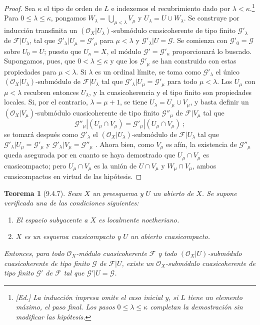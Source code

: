 \documentclass[oneside]{amsart}
\theoremstyle{ega-env-style}
\theoremstyle{ega-thm-env-style}
\newtheorem*{theorem}{Teorema}
\theoremstyle{ega-defn-env-style}
\def\leq{\leqslant}                 %
\let\EGAOriginalLabel\label
\renewcommand{\label}[1]{\phantomsection\EGAOriginalLabel{#1}}
\begin{document}
\begin{proof}
Sea $\kappa$ el tipo de orden de $L$ e indexemos el recubrimiento dado por $\lambda<\kappa$.\footnote{\emph{[Ed.] La inducción impresa omite el caso inicial y, si $L$ tiene un elemento máximo, el paso final. Los pasos $0\leq\lambda\leq\kappa$ completan la demostración sin modificar las hipótesis.}}
Para $0\leq\lambda\leq\kappa$, pongamos $W_\lambda=\bigcup_{\mu<\lambda}V_\mu$ y $U_\lambda=U\cup W_\lambda$.
Se construye por inducción transfinita un $(\mathscr{O}_X|U_\lambda)$-submódulo cuasicoherente de tipo finito
$\mathscr{G}'_\lambda$ de $\mathscr{F}|U_\lambda$, tal que $\mathscr{G}'_\lambda|U_\mu=\mathscr{G}'_\mu$ para $\mu<\lambda$ y
$\mathscr{G}'_\lambda|U=\mathscr{G}$.
Se comienza con $\mathscr{G}'_0=\mathscr{G}$ sobre $U_0=U$; puesto que $U_\kappa=X$,
el módulo $\mathscr{G}'=\mathscr{G}'_\kappa$ proporcionará lo buscado.
Supongamos, pues, que $0<\lambda\leq\kappa$ y que los $\mathscr{G}'_\mu$ se han construido con estas propiedades
para $\mu<\lambda$.
Si $\lambda$ es un ordinal límite, se toma como $\mathscr{G}'_\lambda$ el único $(\mathscr{O}_X|U_\lambda)$-submódulo de
$\mathscr{F}|U_\lambda$ tal que $\mathscr{G}'_\lambda|U_\mu=\mathscr{G}'_\mu$ para todo $\mu<\lambda$.
Los $U_\mu$ con $\mu<\lambda$ recubren entonces $U_\lambda$, y la cuasicoherencia y el tipo finito son propiedades locales.
Si, por el contrario, $\lambda=\mu+1$, se tiene $U_\lambda=U_\mu\cup V_\mu$, y basta
definir un $(\mathscr{O}_X|V_\mu)$-submódulo cuasicoherente de tipo finito
$\mathscr{G}''_\mu$ de $\mathscr{F}|V_\mu$ tal que
\[
  \mathscr{G}''_\mu|(U_\mu\cap V_\mu)
  =\mathscr{G}'_\mu|(U_\mu\cap V_\mu)~;
\]
se tomará después como $\mathscr{G}'_\lambda$ el $(\mathscr{O}_X|U_\lambda)$-submódulo de
$\mathscr{F}|U_\lambda$ tal que $\mathscr{G}'_\lambda|U_\mu=\mathscr{G}'_\mu$ y
$\mathscr{G}'_\lambda|V_\mu=\mathscr{G}''_\mu$ . Ahora bien, como $V_\mu$ es
afín, la existencia de $\mathscr{G}''_\mu$ queda asegurada por  en cuanto se
haya demostrado que $U_\mu\cap V_\mu$ es cuasicompacto; pero $U_\mu\cap V_\mu$ es la
unión de $U\cap V_\mu$ y $W_\mu\cap V_\mu$, ambos cuasicompactos en virtud de las
hipótesis.
\end{proof}

\begin{theorem}[9.4.7]
\label{I.9.4.7}
Sean $X$ un preesquema y $U$ un abierto de $X$. Se supone verificada una de las
condiciones siguientes:
\begin{enumerate}
  \item[\textup{a)}] El espacio subyacente a $X$ es localmente noetheriano.
  \item[\textup{b)}] $X$ es un esquema cuasicompacto y $U$ un abierto cuasicompacto.
\end{enumerate}
Entonces, para todo $\mathscr{O}_X$-módulo cuasicoherente $\mathscr{F}$ y todo
$(\mathscr{O}_X|U)$-submódulo cuasicoherente \textup{de tipo finito} $\mathscr{G}$ de $\mathscr{F}|U$, existe
un $\mathscr{O}_X$-submódulo cuasicoherente \textup{de tipo finito} $\mathscr{G}'$ de $\mathscr{F}$ tal que
$\mathscr{G}'|U=\mathscr{G}$.
\end{theorem}
\end{document}
